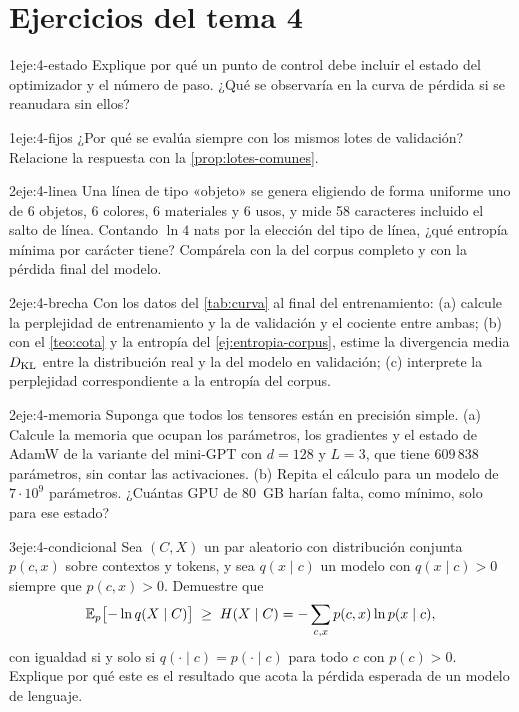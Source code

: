 \section*{Ejercicios del tema 4}

\begin{ejercicio}{1}{eje:4-estado}
Explique por qué un punto de control debe incluir el estado del optimizador y el número de paso. ¿Qué se observaría en la curva de pérdida si se reanudara sin ellos?
\end{ejercicio}

\begin{ejercicio}{1}{eje:4-fijos}
¿Por qué se evalúa siempre con los mismos lotes de validación? Relacione la respuesta con la \cref{prop:lotes-comunes}.
\end{ejercicio}

\begin{ejercicio}{2}{eje:4-linea}
Una línea de tipo «objeto» se genera eligiendo de forma uniforme uno de 6 objetos, 6 colores, 6 materiales y 6 usos, y mide 58 caracteres incluido el salto de línea. Contando $\ln 4$ nats por la elección del tipo de línea, ¿qué entropía mínima por carácter tiene? Compárela con la del corpus completo y con la pérdida final del modelo.
\end{ejercicio}

\begin{ejercicio}{2}{eje:4-brecha}
Con los datos del \cref{tab:curva} al final del entrenamiento: (a) calcule la perplejidad de entrenamiento y la de validación y el cociente entre ambas; (b) con el \cref{teo:cota} y la entropía del \cref{ej:entropia-corpus}, estime la divergencia media $D_{\mathrm{KL}}$ entre la distribución real y la del modelo en validación; (c) interprete la perplejidad correspondiente a la entropía del corpus.
\end{ejercicio}

\begin{ejercicio}{2}{eje:4-memoria}
Suponga que todos los tensores están en precisión simple. (a) Calcule la memoria que ocupan los parámetros, los gradientes y el estado de AdamW de la variante del mini-GPT con $d=128$ y $L=3$, que tiene $609\,838$ parámetros, sin contar las activaciones. (b) Repita el cálculo para un modelo de $7\cdot 10^{9}$ parámetros. ¿Cuántas GPU de $80$~GB harían falta, como mínimo, solo para ese estado?
\end{ejercicio}

\begin{ejercicio}{3}{eje:4-condicional}
Sea $(C,X)$ un par aleatorio con distribución conjunta $p(c,x)$ sobre contextos y tokens, y sea $q(x\mid c)$ un modelo con $q(x\mid c)>0$ siempre que $p(c,x)>0$. Demuestre que
\[
\mathbb{E}_{p}\bigl[-\ln q(X\mid C)\bigr]\;\ge\;H(X\mid C)=-\sum_{c,x}p(c,x)\ln p(x\mid c),
\]
con igualdad si y solo si $q(\cdot\mid c)=p(\cdot\mid c)$ para todo $c$ con $p(c)>0$. Explique por qué este es el resultado que acota la pérdida esperada de un modelo de lenguaje.
\end{ejercicio}
